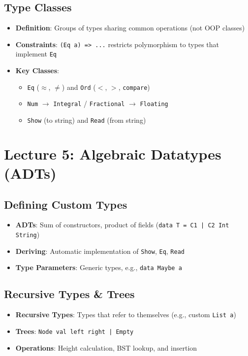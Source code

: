 \documentclass[11pt,twoside=off,openright,numbers=noenddot]{scrbook}
\begin{document}
\section{Type Classes}
\label{sec:org2394aad}
\begin{itemize}
\item \textbf{Definition}: Groups of types sharing common operations (not OOP classes)
\item \textbf{Constraints}: \texttt{(Eq a) => ...} restricts polymorphism to types that implement \texttt{Eq}
\item \textbf{Key Classes}:
\begin{itemize}
\item \texttt{Eq} (\(\approx\), \(\neq\)) and \texttt{Ord} (\(<\), \(>\), \texttt{compare})
\item \texttt{Num} \(\rightarrow\) \texttt{Integral} / \texttt{Fractional} \(\rightarrow\) \texttt{Floating}
\item \texttt{Show} (to string) and \texttt{Read} (from string)
\end{itemize}
\end{itemize}
\chapter{Lecture 5: Algebraic Datatypes (ADTs)}
\label{sec:org6586f71}
\section{Defining Custom Types}
\label{sec:org8716247}
\begin{itemize}
\item \textbf{ADTs}: Sum of constructors, product of fields (\texttt{data T = C1 | C2 Int String})
\item \textbf{Deriving}: Automatic implementation of \texttt{Show}, \texttt{Eq}, \texttt{Read}
\item \textbf{Type Parameters}: Generic types, e.g., \texttt{data Maybe a}
\end{itemize}
\section{Recursive Types \& Trees}
\label{sec:org527452b}
\begin{itemize}
\item \textbf{Recursive Types}: Types that refer to themselves (e.g., custom \texttt{List a})
\item \textbf{Trees}: \texttt{Node val left right | Empty}
\item \textbf{Operations}: Height calculation, BST lookup, and insertion
\end{itemize}
\end{document}
